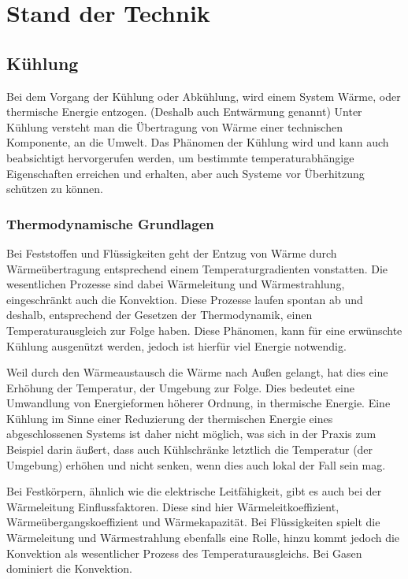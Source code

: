 \chapter{Stand der Technik}


\section{Kühlung} 

Bei dem Vorgang der Kühlung oder Abkühlung, wird einem System Wärme, oder thermische Energie entzogen. (Deshalb auch Entwärmung genannt)
Unter Kühlung versteht man die Übertragung von Wärme einer technischen Komponente, an die Umwelt. Das Phänomen der Kühlung wird und kann auch beabsichtigt hervorgerufen werden, um bestimmte temperaturabhängige Eigenschaften erreichen und erhalten, aber auch Systeme vor Überhitzung schützen zu können. 



\subsection{Thermodynamische Grundlagen}

Bei Feststoffen und Flüssigkeiten geht der Entzug von Wärme durch Wärmeübertragung entsprechend einem Temperaturgradienten vonstatten. Die wesentlichen Prozesse sind dabei Wärmeleitung und Wärmestrahlung, eingeschränkt auch die Konvektion. Diese Prozesse laufen spontan ab und deshalb, entsprechend der Gesetzen der Thermodynamik, einen Temperaturausgleich zur Folge haben. Diese Phänomen, kann für eine erwünschte Kühlung ausgenützt werden, jedoch ist hierfür viel Energie notwendig.  

Weil durch den Wärmeaustausch die Wärme nach Außen gelangt, hat dies eine Erhöhung der Temperatur, der Umgebung zur Folge. Dies bedeutet eine Umwandlung von Energieformen höherer Ordnung, in thermische Energie. Eine Kühlung im Sinne einer Reduzierung der thermischen Energie eines abgeschlossenen Systems ist daher nicht möglich, was sich in der Praxis zum Beispiel darin äußert, dass auch Kühlschränke letztlich die Temperatur (der Umgebung) erhöhen und nicht senken, wenn dies auch lokal der Fall sein mag.

Bei Festkörpern, ähnlich wie die elektrische Leitfähigkeit, gibt es auch bei der Wärmeleitung Einflussfaktoren. Diese sind hier Wärmeleitkoeffizient, Wärmeübergangskoeffizient und Wärmekapazität. Bei Flüssigkeiten spielt die Wärmeleitung und Wärmestrahlung ebenfalls eine Rolle, hinzu kommt jedoch die Konvektion als wesentlicher Prozess des Temperaturausgleichs. Bei Gasen dominiert die Konvektion.


